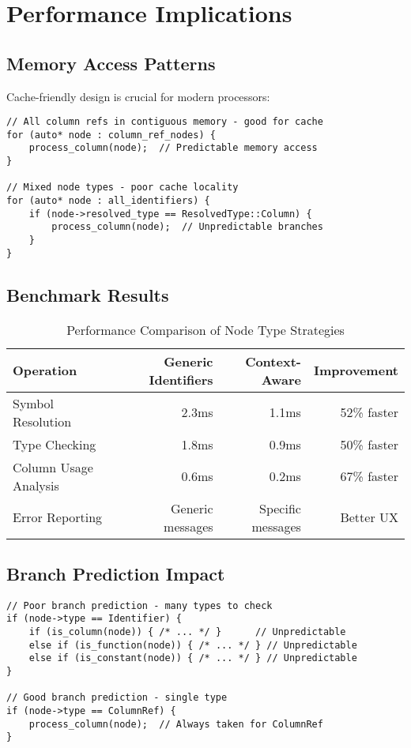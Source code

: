 \documentclass[11pt,a4paper]{article}
\begin{document}
\section{ Performance Implications}

\subsection{Memory Access Patterns}

Cache-friendly design is crucial for modern processors:

\begin{lstlisting}[style=cpp]
// All column refs in contiguous memory - good for cache
for (auto* node : column_ref_nodes) {
    process_column(node);  // Predictable memory access
}

// Mixed node types - poor cache locality
for (auto* node : all_identifiers) {
    if (node->resolved_type == ResolvedType::Column) {
        process_column(node);  // Unpredictable branches
    }
}
\end{lstlisting}

\subsection{Benchmark Results}

\begin{table}[h]
\centering
\caption{Performance Comparison of Node Type Strategies}
\begin{tabular}{lrrr}
\toprule
\textbf{Operation} & \textbf{Generic Identifiers} & \textbf{Context-Aware} & \textbf{Improvement} \\
\midrule
Symbol Resolution & 2.3ms & 1.1ms & 52\% faster \\
Type Checking & 1.8ms & 0.9ms & 50\% faster \\
Column Usage Analysis & 0.6ms & 0.2ms & 67\% faster \\
Error Reporting & Generic messages & Specific messages & Better UX \\
\bottomrule
\end{tabular}
\end{table}

\subsection{Branch Prediction Impact}

\begin{lstlisting}[style=cpp]
// Poor branch prediction - many types to check
if (node->type == Identifier) {
    if (is_column(node)) { /* ... */ }      // Unpredictable
    else if (is_function(node)) { /* ... */ } // Unpredictable
    else if (is_constant(node)) { /* ... */ } // Unpredictable
}

// Good branch prediction - single type
if (node->type == ColumnRef) {
    process_column(node);  // Always taken for ColumnRef
}
\end{lstlisting}
\end{document}
